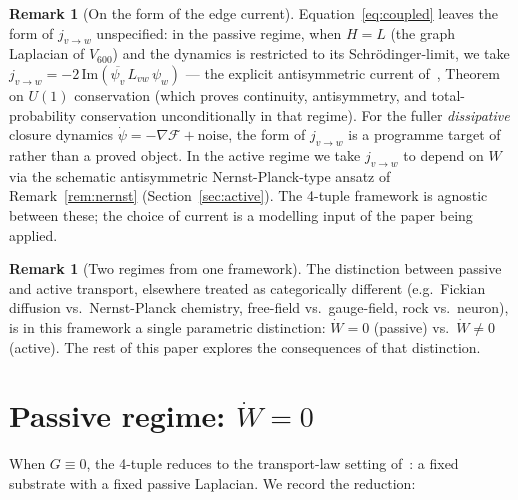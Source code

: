 \documentclass[11pt]{article}
\theoremstyle{definition}
\newtheorem{remark}[theorem]{Remark}
\newcommand{\Fcal}{\mathcal{F}}
\begin{document}
\begin{remark}[On the form of the edge current]
Equation~\eqref{eq:coupled} leaves the form of $j_{v \to w}$ unspecified: in the passive regime, when $H = L$ (the graph Laplacian of $V_{600}$) and the dynamics is restricted to its Schr\"{o}dinger-limit, we take $j_{v \to w} = -2\,\mathrm{Im}(\overline{\psi_v}\,L_{vw}\,\psi_w)$ — the explicit antisymmetric current of~\citep{SmartTransportLaw}, Theorem on $U(1)$ conservation (which proves continuity, antisymmetry, and total-probability conservation unconditionally in that regime). For the fuller \emph{dissipative} closure dynamics $\dot\psi = -\nabla\Fcal + \text{noise}$, the form of $j_{v\to w}$ is a programme target of~\citep{SmartTransportLaw} rather than a proved object. In the active regime we take $j_{v \to w}$ to depend on $W$ via the schematic antisymmetric Nernst-Planck-type ansatz of Remark~\ref{rem:nernst} (Section~\ref{sec:active}). The 4-tuple framework is agnostic between these; the choice of current is a modelling input of the paper being applied.
\end{remark}

\begin{remark}[Two regimes from one framework]
The distinction between passive and active transport, elsewhere treated as categorically different (e.g.\ Fickian diffusion vs.\ Nernst-Planck chemistry, free-field vs.\ gauge-field, rock vs.\ neuron), is in this framework a single parametric distinction: $\dot W = 0$ (passive) vs.\ $\dot W \neq 0$ (active). The rest of this paper explores the consequences of that distinction.
\end{remark}

\section{Passive regime: $\dot W = 0$}\label{sec:passive}

When $G \equiv 0$, the 4-tuple reduces to the transport-law setting of~\citep{SmartTransportLaw}: a fixed substrate with a fixed passive Laplacian. We record the reduction:
\end{document}
